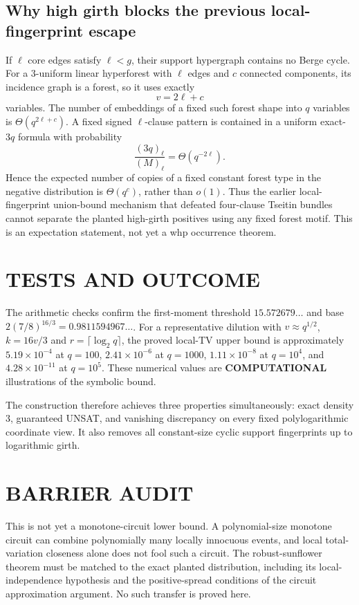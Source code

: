 \documentclass[11pt]{article}
\begin{document}
\subsection{Why high girth blocks the previous local-fingerprint escape}
If $\ell$ core edges satisfy $\ell<g$, their support hypergraph contains no Berge cycle. For a 3-uniform linear hyperforest with $\ell$ edges and $c$ connected components, its incidence graph is a forest, so it uses exactly
\[v=2\ell+c\]
variables. The number of embeddings of a fixed such forest shape into $q$ variables is $\Theta(q^{2\ell+c})$. A fixed signed $\ell$-clause pattern is contained in a uniform exact-$3q$ formula with probability
\[\frac{(3q)_\ell}{(M)_\ell}=\Theta(q^{-2\ell}).\]
Hence the expected number of copies of a fixed constant forest type in the negative distribution is $\Theta(q^c)$, rather than $o(1)$. Thus the earlier local-fingerprint union-bound mechanism that defeated four-clause Tseitin bundles cannot separate the planted high-girth positives using any fixed forest motif. This is an expectation statement, not yet a whp occurrence theorem.

\section{TESTS AND OUTCOME}
The arithmetic checks confirm the first-moment threshold $15.572679\ldots$ and base $2(7/8)^{16/3}=0.9811594967\ldots$. For a representative dilution with $v\approx q^{1/2}$, $k=16v/3$ and $r=\lceil\log_2q\rceil$, the proved local-TV upper bound is approximately $5.19\times10^{-4}$ at $q=100$, $2.41\times10^{-6}$ at $q=1000$, $1.11\times10^{-8}$ at $q=10^4$, and $4.28\times10^{-11}$ at $q=10^5$. These numerical values are \textbf{COMPUTATIONAL} illustrations of the symbolic bound.

The construction therefore achieves three properties simultaneously: exact density $3$, guaranteed UNSAT, and vanishing discrepancy on every fixed polylogarithmic coordinate view. It also removes all constant-size cyclic support fingerprints up to logarithmic girth.

\section{BARRIER AUDIT}
This is not yet a monotone-circuit lower bound. A polynomial-size monotone circuit can combine polynomially many locally innocuous events, and local total-variation closeness alone does not fool such a circuit. The robust-sunflower theorem must be matched to the exact planted distribution, including its local-independence hypothesis and the positive-spread conditions of the circuit approximation argument. No such transfer is proved here.
\end{document}
